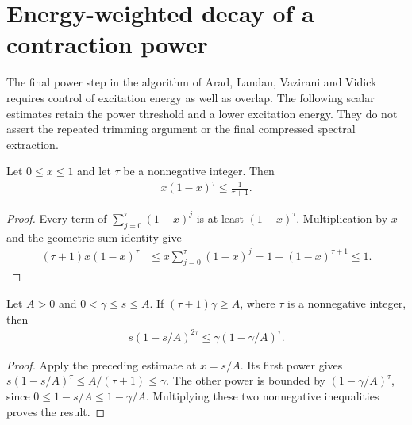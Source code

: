 \section{Energy-weighted decay of a contraction power}
\label{sec:energy_weighted_power}

The final power step in the algorithm of Arad, Landau, Vazirani and
Vidick~\cite[lines 1811--1815]{Arad2016RigorousRG} requires control of
excitation energy as well as overlap. The following scalar estimates
retain the power threshold and a lower excitation energy. They do not
assert the repeated trimming argument or the final compressed spectral
extraction.

\begin{lemma}
    \label{lem:unit_energy_weighted_power}
    \leanok
    Let $0\leq x\leq1$ and let $\tau$ be a nonnegative integer. Then
    \begin{align}
        x(1-x)^\tau\leq\frac1{\tau+1}.
    \end{align}
\end{lemma}
\begin{proof}\leanok
    Every term of $\sum_{j=0}^\tau(1-x)^j$ is at least $(1-x)^\tau$.
    Multiplication by $x$ and the geometric-sum identity give
    \begin{align}
        (\tau+1)x(1-x)^\tau
         & \leq x\sum_{j=0}^\tau(1-x)^j
                                          =1-(1-x)^{\tau+1}\leq1.
    \end{align}
\end{proof}

\begin{lemma}
    \label{lem:gap_energy_weighted_power}
    \leanok
    Let $A>0$ and $0<\gamma\leq s\leq A$. If
    $(\tau+1)\gamma\geq A$, where $\tau$ is a nonnegative integer, then
    \begin{align}
        s(1-s/A)^{2\tau}\leq\gamma(1-\gamma/A)^\tau.
    \end{align}
\end{lemma}
\begin{proof}\leanok
    Apply the preceding estimate at $x=s/A$. Its first power gives
    $s(1-s/A)^\tau\leq A/(\tau+1)\leq\gamma$.
    The other power is bounded by $(1-\gamma/A)^\tau$, since
    $0\leq1-s/A\leq1-\gamma/A$. Multiplying these two nonnegative
    inequalities proves the result.
\end{proof}


